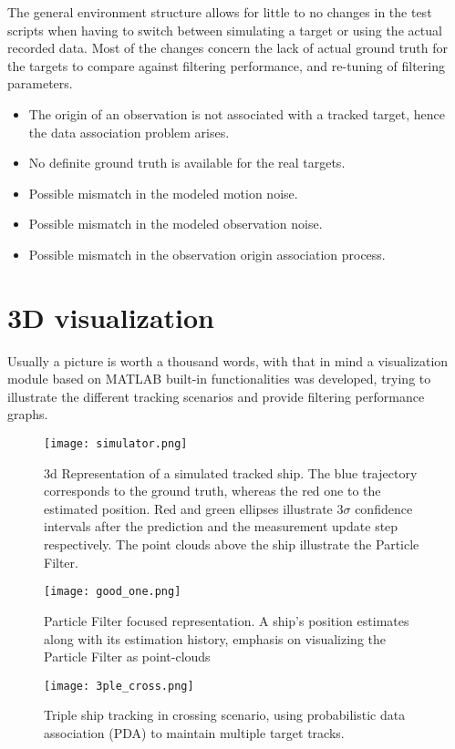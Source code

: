 The general environment structure allows for little to no changes in the test scripts when having to switch between simulating a target or using the actual recorded data. Most of the changes concern the lack of actual ground truth for the targets to compare against filtering performance, and re-tuning of filtering parameters.
\begin{itemize}
	\item  The origin of an observation is not associated with a tracked target, hence the data association problem arises.
	\item No definite ground truth is available for the real targets.
	\item Possible mismatch in the modeled motion noise.
	\item Possible mismatch in the modeled observation noise.
	\item Possible mismatch in the observation origin association process.
\end{itemize}

\section{3D visualization}

Usually a picture is worth a thousand words, with that in mind a visualization module based on MATLAB built-in functionalities was developed, trying to illustrate the different tracking scenarios and provide filtering performance graphs. 

\begin{figure}[H]
	\centering
	\texttt{[image: simulator.png]}
	\caption{3d Representation of a simulated tracked ship. The blue trajectory corresponds to the ground truth, whereas the red one  to the estimated position. Red and green ellipses illustrate $3\sigma$ confidence intervals after the prediction and the measurement update step respectively. The point clouds above the ship illustrate the Particle Filter.}
	\label{fig:simulator1}
\end{figure}

\begin{figure}[H]
	\centering
	\texttt{[image: good\_one.png]}
		\caption{Particle Filter focused representation. A ship's position estimates along with its estimation history, emphasis on visualizing the Particle Filter as  point-clouds}	\label{fig:simulator2}
\end{figure}


\begin{figure}[H]
	\centering
	\texttt{[image: 3ple\_cross.png]}
	\caption{Triple ship tracking in crossing scenario, using probabilistic data association (PDA) to maintain multiple target tracks.	}\label{fig:simulator3}
\end{figure}


